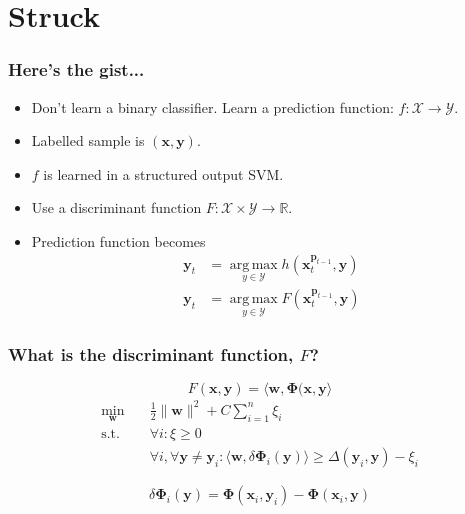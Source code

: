 \documentclass[mathserif,handout]{beamer}
\DeclareMathOperator*{\argmax}{arg\,max}
\DeclareMathOperator{\st}{\text{s.t.} \quad}
\begin{document}

\section{Struck}

\begin{frame}
    \frametitle{Here's the gist...}

    \begin{itemize}
        \item Don't learn a binary classifier. Learn a prediction function: $f :
            \mathcal{X} \rightarrow \mathcal{Y}$.
        \item Labelled sample is $(\mathbf{x}, \mathbf{y})$.
        \item $f$ is learned in a structured output SVM.
        \item Use a discriminant function $F: \mathcal{X} \times \mathcal{Y}
            \rightarrow \mathbb{R}$.
        \item Prediction function becomes %
            \begin{align}
                \mathbf{y}_t &= \argmax\limits_{y \in \mathcal{Y}} h \left( \mathbf{x}_t^{\mathbf{p}_{t-1}}, \mathbf{y} \right) \tag{prior} \\
                \mathbf{y}_t &= \argmax\limits_{y \in \mathcal{Y}} F \left( \mathbf{x}_t^{\mathbf{p}_{t-1}}, \mathbf{y} \right) \tag{Struck}
            \end{align}
    \end{itemize}
\end{frame}

\begin{frame}
    \frametitle{What is the discriminant function, $F$?}
    \begin{equation}
        F(\mathbf{x}, \mathbf{y}) = \langle \mathbf{w}, \mathbf{\Phi}(\mathbf{x}, \mathbf{y}\rangle
    \end{equation}
    \begin{equation} \label{eq:minimizing_hyperplane}
        \begin{aligned}
            \min_{\mathbf{w}} \quad & \frac{1}{2} \|\mathbf{w}\|^2 + C \sum_{i=1}^n \xi_i \\
            \st & \forall i : \xi \ge 0 \\
                & \forall i, \forall \mathbf{y} \ne \mathbf{y}_i : \langle \mathbf{w}, \delta \mathbf{\Phi}_i (\mathbf{y}) \rangle \ge \Delta (\mathbf{y}_i, \mathbf{y}) - \xi_i
        \end{aligned}
    \end{equation}

    \begin{equation}
        \delta \mathbf{\Phi}_i (\mathbf{y}) = \mathbf{\Phi}(\mathbf{x}_i, \mathbf{y}_i) - \mathbf{\Phi}(\mathbf{x}_i, \mathbf{y})
    \end{equation}
\end{frame}
\end{document}
